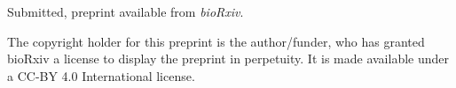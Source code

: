 \vspace{10pt}
\noindent Submitted, preprint available from \emph{bioRxiv}.

\vspace{60pt}
\noindent
The copyright holder for this preprint is the author/funder, who has
granted bioRxiv a license to display the preprint in perpetuity. It is
made available under a CC-BY 4.0 International license.

\cleardoublepage
%

















\restoregeometry

%
